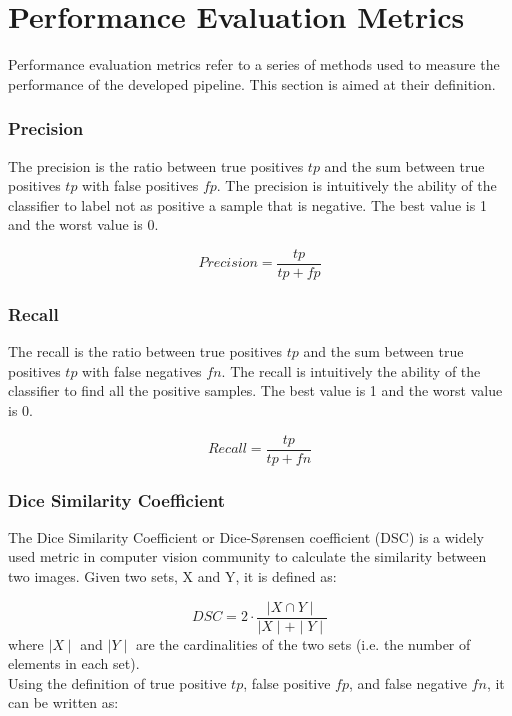 \documentclass{standalone}
\begin{document}
\section{Performance Evaluation Metrics}

Performance evaluation metrics refer to a series of methods used to measure the performance of the developed pipeline.
This section is aimed at their definition.
\subsubsection{Precision}

The precision is the ratio between true positives $tp$ and the sum between true positives $tp$ with false positives $fp$.
The precision is intuitively the ability of the classifier to label not as positive a sample that is negative.
The best value is 1 and the worst value is 0.

\begin{equation*}
    Precision = \frac{tp}{tp + fp}
\end{equation*}


\subsubsection{Recall}

The recall is the ratio between true positives $tp$ and the sum between true positives $tp$ with false negatives $fn$.
The recall is intuitively the ability of the classifier to find all the positive samples.
The best value is 1 and the worst value is 0.

\begin{equation*}
    Recall = \frac{tp}{tp + fn}
\end{equation*}


\subsubsection{Dice Similarity Coefficient}
The Dice Similarity Coefficient or Dice-Sørensen coefficient (DSC) is a widely used metric in computer vision community to calculate the similarity between two images\cite{diceloss}.
Given two sets, X and Y, it is defined as:

\begin{equation*}
    DSC = 2 \cdot \frac{\mid  X \cap  Y \mid }{\mid X \mid + \mid  Y \mid }
\end{equation*}
where $\mid X \mid $ and  $\mid  Y \mid$  are the cardinalities of the two sets (i.e. the number of elements in each set). 
\\
Using the definition of true positive $tp$, false positive $fp$, and false negative $fn$, it can be written as:
\end{document}
